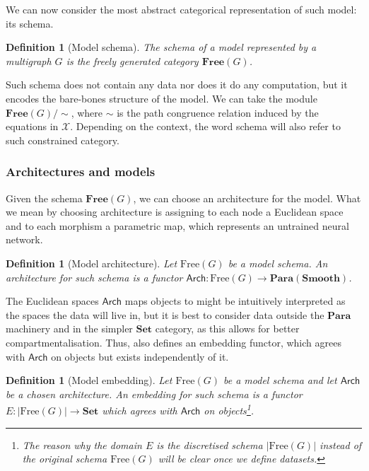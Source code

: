 \documentclass[12pt,a4paper,openright,twoside]{report}
\theoremstyle{plain}
\newtheorem{definition}[proposition]{Definition}
\theoremstyle{definition}
\begin{document}
We can now consider the most abstract categorical representation of such model: its schema. 

\begin{definition}[Model schema]
  The schema of a model represented by a multigraph $G$ is the freely generated category $\mathbf{Free}(G)$.
\end{definition}

Such schema does not contain any data nor does it do any computation, but it encodes the bare-bones structure of the model. We can take the module $\mathbf{Free}(G)/{\sim}$, where ${\sim}$ is the path congruence relation induced by the equations in $\mathcal{X}$. Depending on the context, the word schema will also refer to such constrained category.

\subsubsection{Architectures and models}


Given the schema $\mathbf{Free}(G)$, we can choose an architecture for the model. What we mean by choosing architecture is assigning to each node a Euclidean space and to each morphism a parametric map, which represents an untrained neural network.

\begin{definition}[Model architecture]
  Let $\mathrm{Free}(G)$ be a model schema. An architecture for such schema is a functor $\mathsf{Arch}: \mathrm{Free}(G) \to \mathbf{Para}(\mathbf{Smooth})$.
\end{definition}

The Euclidean spaces $\mathsf{Arch}$ maps objects to might be intuitively interpreted as the spaces the data will live in, but it is best to consider data outside the $\mathbf{Para}$ machinery and in the simpler $\mathbf{Set}$ category, as this allows for better compartmentalisation. Thus, \cite{gavranovic2019compositional} also defines an embedding functor, which agrees with $\mathsf{Arch}$ on objects but exists independently of it.


\begin{definition}[Model embedding]
  Let $\mathrm{Free}(G)$ be a model schema and let $\mathsf{Arch}$ be a chosen architecture. An embedding for such schema is a functor $E: |\mathrm{Free}(G)| \to \mathbf{Set}$ which agrees with $\mathsf{Arch}$ on objects\footnote{The reason why the domain $E$ is the discretised schema $|\mathrm{Free}(G)|$ instead of the original schema $\mathrm{Free}(G)$ will be clear once we define datasets.}.
\end{definition}
\end{document}
